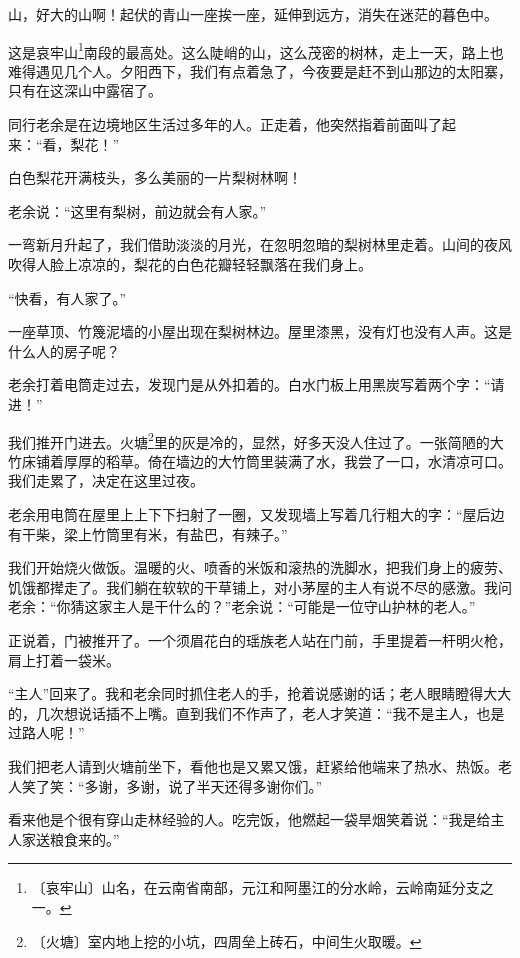 \documentclass[12pt,UTF-8,openany]{ctexbook}
\begin{document}
\begin{large}
    
    山，好大的山啊！起伏的青山一座挨一座，延伸到远方，消失在迷茫的暮色中。
    
    这是哀牢山\footnote{〔哀牢山〕山名，在云南省南部，元江和阿墨江的分水岭，云岭南延分支之一。}南段的最高处。这么陡峭的山，这么茂密的树林，走上一天，路上也难得遇见几个人。夕阳西下，我们有点着急了，今夜要是赶不到山那边的太阳寨，只有在这深山中露宿了。
    
    同行老余是在边境地区生活过多年的人。正走着，他突然指着前面叫了起来：“看，梨花！”
    
    白色梨花开满枝头，多么美丽的一片梨树林啊！
    
    老余说：“这里有梨树，前边就会有人家。”
    
    一弯新月升起了，我们借助淡淡的月光，在忽明忽暗的梨树林里走着。山间的夜风吹得人脸上凉凉的，梨花的白色花瓣轻轻飘落在我们身上。
    
    “快看，有人家了。”
    
    一座草顶、竹篾泥墙的小屋出现在梨树林边。屋里漆黑，没有灯也没有人声。这是什么人的房子呢？
    
    老余打着电筒走过去，发现门是从外扣着的。白水门板上用黑炭写着两个字：“请进！”
    
    我们推开门进去。火塘\footnote{〔火塘〕室内地上挖的小坑，四周垒上砖石，中间生火取暖。}里的灰是冷的，显然，好多天没人住过了。一张简陋的大竹床铺着厚厚的稻草。倚在墙边的大竹筒里装满了水，我尝了一口，水清凉可口。我们走累了，决定在这里过夜。
    
    老余用电筒在屋里上上下下扫射了一圈，又发现墙上写着几行粗大的字：“屋后边有干柴，梁上竹筒里有米，有盐巴，有辣子。”
    
    我们开始烧火做饭。温暖的火、喷香的米饭和滚热的洗脚水，把我们身上的疲劳、饥饿都撵走了。我们躺在软软的干草铺上，对小茅屋的主人有说不尽的感激。我问老余：“你猜这家主人是干什么的？”老余说：“可能是一位守山护林的老人。”
    
    正说着，门被推开了。一个须眉花白的瑶族老人站在门前，手里提着一杆明火枪，肩上打着一袋米。
    
    “主人”回来了。我和老余同时抓住老人的手，抢着说感谢的话；老人眼睛瞪得大大的，几次想说话插不上嘴。直到我们不作声了，老人才笑道：“我不是主人，也是过路人呢！”
    
    我们把老人请到火塘前坐下，看他也是又累又饿，赶紧给他端来了热水、热饭。老人笑了笑：“多谢，多谢，说了半天还得多谢你们。”
    
    看来他是个很有穿山走林经验的人。吃完饭，他燃起一袋旱烟笑着说：“我是给主人家送粮食来的。”
    

\end{large}
\end{document}
